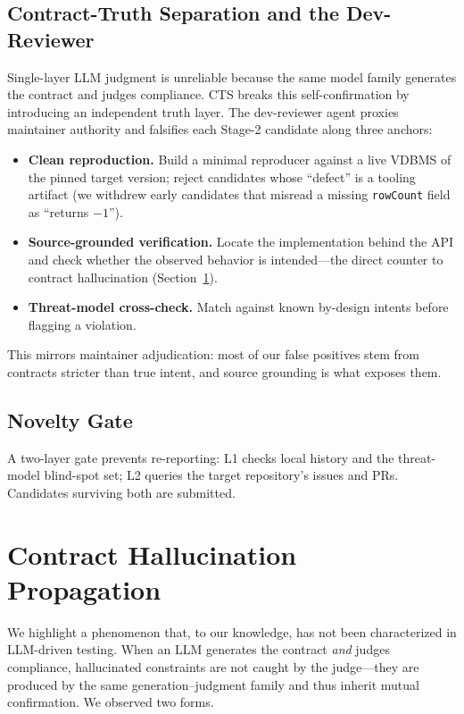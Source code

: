 \documentclass[sigconf]{acmart}
\begin{document}
\subsection{Contract-Truth Separation and the Dev-Reviewer}\label{sec:cts}
Single-layer LLM judgment is unreliable because the same model family generates the contract and judges compliance. CTS breaks this self-confirmation by introducing an independent truth layer. The dev-reviewer agent proxies maintainer authority and falsifies each Stage-2 candidate along three anchors:
\begin{itemize}[leftmargin=*,itemsep=2pt]
\item \textbf{Clean reproduction.} Build a minimal reproducer against a live VDBMS of the pinned target version; reject candidates whose ``defect'' is a tooling artifact (we withdrew early candidates that misread a missing \texttt{rowCount} field as ``returns $-1$'').
\item \textbf{Source-grounded verification.} Locate the implementation behind the API and check whether the observed behavior is intended---the direct counter to contract hallucination (Section~\ref{sec:hallucination}).
\item \textbf{Threat-model cross-check.} Match against known by-design intents before flagging a violation.
\end{itemize}
This mirrors maintainer adjudication: most of our false positives stem from contracts stricter than true intent, and source grounding is what exposes them.

\subsection{Novelty Gate}
A two-layer gate prevents re-reporting: L1 checks local history and the threat-model blind-spot set; L2 queries the target repository's issues and PRs. Candidates surviving both are submitted.

\section{Contract Hallucination Propagation}\label{sec:hallucination}
We highlight a phenomenon that, to our knowledge, has not been characterized in LLM-driven testing. When an LLM generates the contract \emph{and} judges compliance, hallucinated constraints are not caught by the judge---they are produced by the same generation--judgment family and thus inherit mutual confirmation. We observed two forms.
\end{document}
